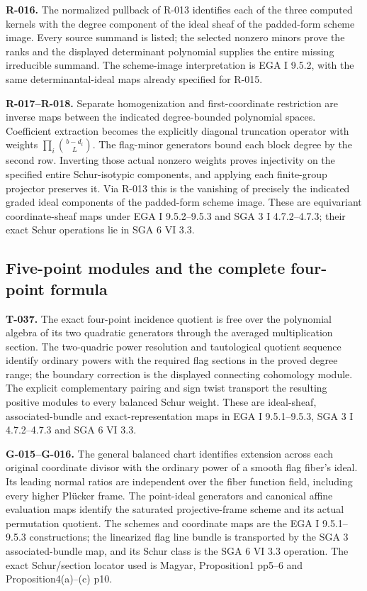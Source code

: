 \documentclass[
  10pt,
]{article}
\begin{document}
\textbf{R-016.} The normalized pullback of R-013 identifies each of the
three computed kernels with the degree component of the ideal sheaf of
the padded-form scheme image. Every source summand is listed; the
selected nonzero minors prove the ranks and the displayed determinant
polynomial supplies the entire missing irreducible summand. The
scheme-image interpretation is EGA I 9.5.2, with the same
determinantal-ideal maps already specified for R-015.

\textbf{R-017--R-018.} Separate homogenization and first-coordinate
restriction are inverse maps between the indicated degree-bounded
polynomial spaces. Coefficient extraction becomes the explicitly
diagonal truncation operator with weights \(\prod_i\binom{b-d_i}{L}\).
The flag-minor generators bound each block degree by the second row.
Inverting those actual nonzero weights proves injectivity on the
specified entire Schur-isotypic components, and applying each
finite-group projector preserves it. Via R-013 this is the vanishing of
precisely the indicated graded ideal components of the padded-form
scheme image. These are equivariant coordinate-sheaf maps under EGA I
9.5.2--9.5.3 and SGA 3 I 4.7.2--4.7.3; their exact Schur operations lie
in SGA 6 VI 3.3.

\subsection{Five-point modules and the complete four-point
formula}\label{five-point-modules-and-the-complete-four-point-formula}

\textbf{T-037.} The exact four-point incidence quotient is free over the
polynomial algebra of its two quadratic generators through the averaged
multiplication section. The two-quadric power resolution and
tautological quotient sequence identify ordinary powers with the
required flag sections in the proved degree range; the boundary
correction is the displayed connecting cohomology module. The explicit
complementary pairing and sign twist transport the resulting positive
modules to every balanced Schur weight. These are ideal-sheaf,
associated-bundle and exact-representation maps in EGA I 9.5.1--9.5.3,
SGA 3 I 4.7.2--4.7.3 and SGA 6 VI 3.3.

\textbf{G-015--G-016.} The general balanced chart identifies extension
across each original coordinate divisor with the ordinary power of a
smooth flag fiber's ideal. Its leading normal ratios are independent
over the fiber function field, including every higher Plücker frame. The
point-ideal generators and canonical affine evaluation maps identify the
saturated projective-frame scheme and its actual permutation quotient.
The schemes and coordinate maps are the EGA I 9.5.1--9.5.3
constructions; the linearized flag line bundle is transported by the SGA
3 associated-bundle map, and its Schur class is the SGA 6 VI 3.3
operation. The exact Schur/section locator used is Magyar, Proposition1
pp5--6 and Proposition4(a)--(c) p10.
\end{document}
